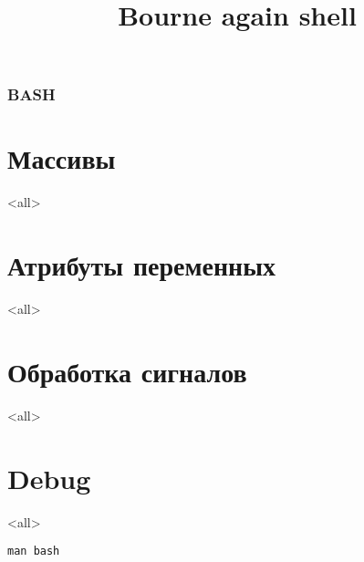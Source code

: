 
\title[bash]{Bourne again shell}




\begin{frame}
	\frametitle{BASH}
	\titlepage
	\vspace{-0.5cm}
	\begin{center}
	\end{center}
\end{frame}

\begin{frame}
	\tableofcontents
\end{frame}




\section{Массивы}

\mode<all>{}

\section{Атрибуты переменных}
\mode<all>{}

\section{Обработка сигналов}
\mode<all>{}

\section{Debug}
\mode<all>{}


\begin{frame}{}
\Huge
\begin{center}
	{\tt man bash}
\end{center}
\end{frame}



